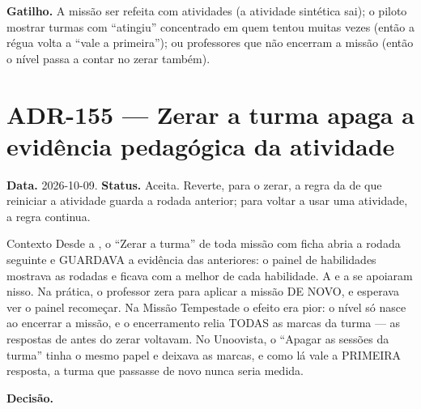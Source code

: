\textbf{Gatilho.} A missão ser refeita com atividades (a atividade sintética
sai); o piloto mostrar turmas com \enquote{atingiu} concentrado em quem tentou
muitas vezes (então a régua volta a \enquote{vale a primeira}); ou professores
que não encerram a missão (então o nível passa a contar no zerar também).

\section{ADR-155 --- Zerar a turma apaga a evidência pedagógica da atividade}
\label{adr:zerar-apaga-evidencia}

\textbf{Data.} 2026-10-09. \textbf{Status.} Aceita. Reverte, para o zerar, a
regra da  de que reiniciar a atividade guarda a rodada anterior;
para voltar a usar uma atividade, a regra continua.

\begin{especificacao}{Contexto}
Desde a , o \enquote{Zerar a turma} de toda missão com ficha
abria a rodada seguinte e GUARDAVA a evidência das anteriores: o painel de
habilidades mostrava as rodadas e ficava com a melhor de cada habilidade. A
 e a  se apoiaram nisso. Na prática, o professor
zera para aplicar a missão DE NOVO, e esperava ver o painel recomeçar. Na
Missão Tempestade o efeito era pior: o nível só nasce ao encerrar a missão, e
o encerramento relia TODAS as marcas da turma --- as respostas de antes do
zerar voltavam. No Unoovista, o \enquote{Apagar as sessões da turma} tinha o
mesmo papel e deixava as marcas, e como lá vale a PRIMEIRA resposta, a turma
que passasse de novo nunca seria medida.
\end{especificacao}

\textbf{Decisão.}

